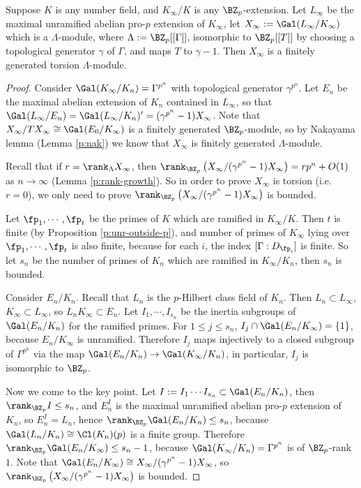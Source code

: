 \begin{thm}[Iwasawa]\label{p:f-g-torsion2}
Suppose $K$ is any number field, and $K_\infty/K$ is any $\BZ_p$-extension.
Let $L_\infty$ be the maximal unramified abelian pro-$p$ extension of $K_\infty$,
let $X_\infty:=\Gal(L_\infty/K_\infty)$ which is a $\Lambda$-module,
where $\Lambda:=\BZ_p[[\Gamma]]$, isomorphic to $\BZ_p[[T]]$
by choosing a topological generator $\gamma$ of $\Gamma$,
and maps $T$ to $\gamma-1$. Then $X_\infty$ is a finitely generated torsion
$\Lambda$-module.
\end{thm}

\begin{proof}
Consider $\Gal(K_\infty/K_n)=\Gamma^{p^n}$ with topological generator
$\gamma^{p^n}$. Let $E_n$ be the maximal abelian extension of $K_n$
contained in $L_\infty$, so that $\Gal(L_\infty/E_n)=\Gal(L_\infty/K_n)'
=(\gamma^{p^n}-1)X_\infty$. Note that $X_\infty/TX_\infty\cong\Gal(E_0/K_\infty)$
is a finitely generated $\BZ_p$-module, so by Nakayama lemma
(Lemma \ref{p:nak}) we know that $X_\infty$ is finitely generated $\Lambda$-module.

Recall that if $r=\rank_\Lambda X_\infty$, then
$\rank_{\BZ_p}\left(X_\infty/(\gamma^{p^n}-1)X_\infty\right)=rp^n+O(1)$
as $n\to\infty$ (Lemma \ref{p:rank-growth}). So in order to prove
$X_\infty$ is torsion (i.e. $r=0$), we only need to prove
$\rank_{\BZ_p}\left(X_\infty/(\gamma^{p^n}-1)X_\infty\right)$ is bounded.

Let $\fp_1,\cdots,\fp_t$ be the primes of $K$ which are ramified in $K_\infty/K$.
Then $t$ is finite (by Proposition \ref{p:unr-outside-p}),
and number of primes of $K_\infty$ lying over $\fp_1,\cdots,\fp_t$
is also finite, because for each $i$, the index $[\Gamma:D_{\fp_i}]$
is finite. So let $s_n$ be the number of primes of $K_n$ which are
ramified in $K_\infty/K_n$, then $s_n$ is bounded.

Consider $E_n/K_n$. Recall that $L_n$ is the $p$-Hilbert class field
of $K_n$. Then $L_n\subset L_\infty$, $K_\infty\subset L_\infty$,
so $L_nK_\infty\subset E_n$. Let $I_1,\cdots,I_{s_n}$ be the inertia
subgroups of $\Gal(E_n/K_n)$ for the ramified primes.
For $1\leq j\leq s_n$, $I_j\cap\Gal(E_n/K_\infty)=\{1\}$,
because $E_n/K_\infty$ is unramified. Therefore $I_j$ maps injectively
to a closed subgroup of $\Gamma^{p^n}$
via the map $\Gal(E_n/K_n)\to\Gal(K_\infty/K_n)$,
in particular, $I_j$ is isomorphic to $\BZ_p$.

Now we come to the key point. Let $I:=I_1\cdots I_{s_n}\subset\Gal(E_n/K_n)$,
then $\rank_{\BZ_p}I\leq s_n$, and $E_n^I$ is the maximal
unramified abelian pro-$p$ extension of $K_n$, so $E_n^I=L_n$,
hence $\rank_{\BZ_p}\Gal(E_n/K_n)\leq s_n$,
because $\Gal(L_n/K_n)\cong\Cl(K_n)(p)$ is a finite group.
Therefore $\rank_{\BZ_p}\Gal(E_n/K_\infty)\leq s_n-1$,
because $\Gal(K_\infty/K_n)=\Gamma^{p^n}$ is of $\BZ_p$-rank $1$.
Note that $\Gal(E_n/K_\infty)\cong X_\infty/(\gamma^{p^n}-1)X_\infty$,
so $\rank_{\BZ_p}\left(X_\infty/(\gamma^{p^n}-1)X_\infty\right)$ is bounded.
\end{proof}

